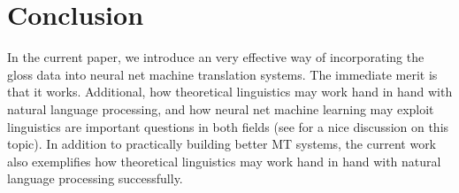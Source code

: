 \documentclass[a4paper]{article}
\begin{document}
\section{Conclusion}
In the current paper, we introduce an very effective way of incorporating the gloss data into neural net machine translation systems. The immediate merit is that it works. Additional, how theoretical linguistics may work hand in hand with natural language processing, and how neural net machine learning may exploit linguistics are important questions in both fields (see \citet{pater2017generative} for a nice discussion on this topic). In addition to practically building better MT systems, the current work also exemplifies how theoretical linguistics may work hand in hand with natural language processing successfully. 





\appendix
\newpage
\end{document}
